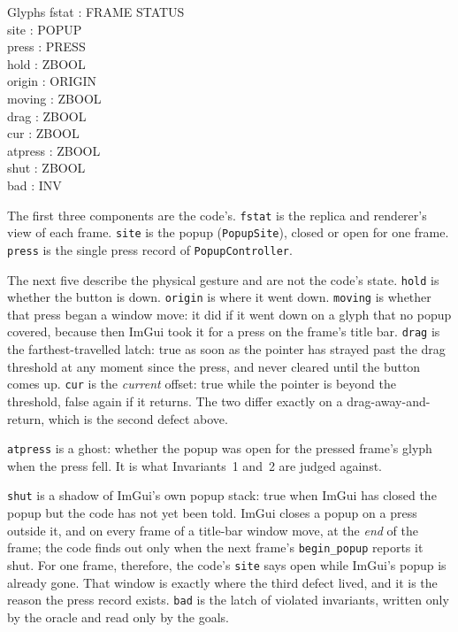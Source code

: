 \documentclass[a4paper,10pt,fleqn]{article}
\begin{document}
\begin{schema}{Glyphs}
  fstat : FRAME \fun STATUS \\
  site : POPUP \\
  press : PRESS \\
  hold : ZBOOL \\
  origin : ORIGIN \\
  moving : ZBOOL \\
  drag : ZBOOL \\
  cur : ZBOOL \\
  atpress : ZBOOL \\
  shut : ZBOOL \\
  bad : \power INV
\end{schema}

The first three components are the code's.  \texttt{fstat} is the replica and
renderer's view of each frame.  \texttt{site} is the popup
(\texttt{PopupSite}), closed or open for one frame.  \texttt{press} is the
single press record of \texttt{PopupController}.

The next five describe the physical gesture and are not the code's state.
\texttt{hold} is whether the button is down.  \texttt{origin} is where it went
down.  \texttt{moving} is whether that press began a window move: it did if it
went down on a glyph that no popup covered, because then ImGui took it for a
press on the frame's title bar.  \texttt{drag} is the farthest-travelled latch:
true as soon as the pointer has strayed past the drag threshold at any moment
since the press, and never cleared until the button comes up.  \texttt{cur}
is the \emph{current} offset: true while the pointer is beyond the threshold,
false again if it returns.  The two differ exactly on a drag-away-and-return,
which is the second defect above.

\texttt{atpress} is a ghost: whether the popup was open for the pressed
frame's glyph when the press fell.  It is what Invariants~1 and~2 are judged
against.

\texttt{shut} is a shadow of ImGui's own popup stack: true when ImGui has
closed the popup but the code has not yet been told.  ImGui closes a popup on
a press outside it, and on every frame of a title-bar window move, at the
\emph{end} of the frame; the code finds out only when the next frame's
\texttt{begin\_popup} reports it shut.  For one frame, therefore, the code's
\texttt{site} says open while ImGui's popup is already gone.  That window is
exactly where the third defect lived, and it is the reason the press record
exists.  \texttt{bad} is the latch of violated invariants, written only by the
oracle and read only by the goals.
\end{document}
